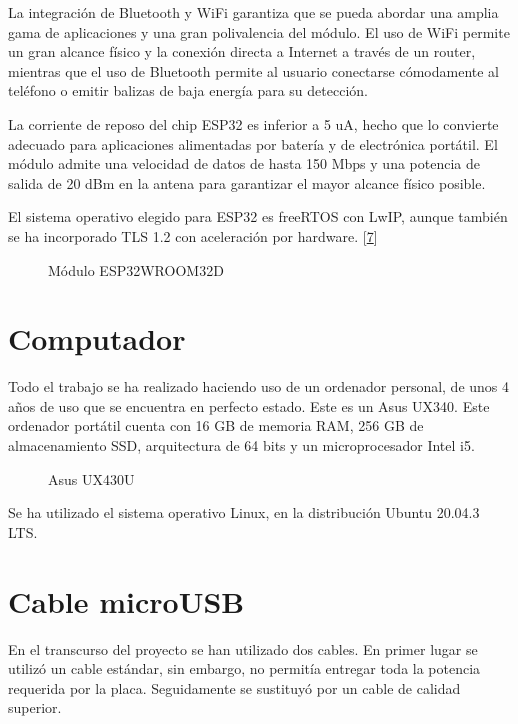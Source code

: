 \documentclass[a4paper,11pt,spanish]{sphinxmanual}
\let\sphinxpxdimen\pdfpxdimen\else\newdimen\sphinxpxdimen
\begin{document}
\sphinxAtStartPar
La integración de Bluetooth y Wi\sphinxhyphen{}Fi garantiza que se pueda abordar
una amplia gama de aplicaciones y una gran polivalencia del módulo.
El uso de Wi\sphinxhyphen{}Fi permite un gran alcance físico y la conexión directa
a Internet a través de un router, mientras que el uso de Bluetooth
permite al usuario conectarse cómodamente al teléfono o emitir balizas
de baja energía para su detección.

\sphinxAtStartPar
La corriente de reposo del chip ESP32 es inferior a 5 uA, hecho que lo
convierte adecuado para aplicaciones alimentadas por batería y de electrónica
portátil. El módulo admite una velocidad de datos de hasta 150 Mbps y
una potencia de salida de 20 dBm en la antena para garantizar el mayor
alcance físico posible.

\sphinxAtStartPar
El sistema operativo elegido para ESP32 es freeRTOS con LwIP,
aunque también se ha incorporado TLS 1.2 con aceleración por hardware. {[}\hyperlink{cite.marco_teorico_y_estado_del_arte:id33}{7}{]}

\begin{figure}[htbp]
\centering
\capstart

\noindent\sphinxincludegraphics[width=300\sphinxpxdimen]{{WROOM32D}.jpg}
\caption{Módulo ESP32\sphinxhyphen{}WROOM\sphinxhyphen{}32D}\label{\detokenize{hardware:id7}}\end{figure}


\section{Computador}
\label{\detokenize{hardware:computador}}
\sphinxAtStartPar
Todo el trabajo se ha realizado haciendo uso de un ordenador personal,
de unos 4 años de uso que se encuentra en perfecto estado.
Este es un Asus UX340.
Este ordenador portátil cuenta con 16 GB de memoria RAM, 256 GB de
almacenamiento SSD, arquitectura de 64 bits y un microprocesador Intel i5.

\begin{figure}[htbp]
\centering
\capstart

\noindent\sphinxincludegraphics[width=150\sphinxpxdimen]{{asus_UX430U}.jpg}
\caption{Asus UX430U}\label{\detokenize{hardware:id8}}\end{figure}

\sphinxAtStartPar
Se ha utilizado el sistema operativo Linux, en la distribución Ubuntu 20.04.3 LTS.


\section{Cable micro\sphinxhyphen{}USB}
\label{\detokenize{hardware:cable-micro-usb}}
\sphinxAtStartPar
En el transcurso del proyecto se han utilizado dos cables. En
primer lugar se utilizó un cable estándar, sin embargo, no permitía
entregar toda la potencia requerida por la placa. Seguidamente se
sustituyó por un cable de calidad superior.
\end{document}
